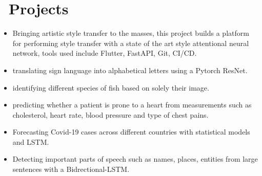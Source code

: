 \section{\texorpdfstring{\faTasks}{}\ Projects}
\begin{itemize}[parsep=0.5ex]
    \item \textbf{}
          \newline Bringing artistic style transfer to the masses, this project builds a platform for performing style transfer with a state of the art style attentional neural network, tools used include Flutter, FastAPI, Git, CI/CD.
    \item \textbf{}
          \newline translating sign language into alphabetical letters using a Pytorch ResNet.
    \item \textbf{}
          \newline identifying different species of fish based on solely their image.
    \item \textbf{}
          \newline predicting whether a patient is prone to a heart from measurements such as cholesterol, heart rate, blood pressure and type of chest pains.
    \item \textbf{}
          \newline Forecasting Covid-19 cases across different countries with statistical models and LSTM.
    \item \textbf{}
          \newline Detecting important parts of speech such as names, places, entities from large sentences with a Bidrectional-LSTM.
\end{itemize}